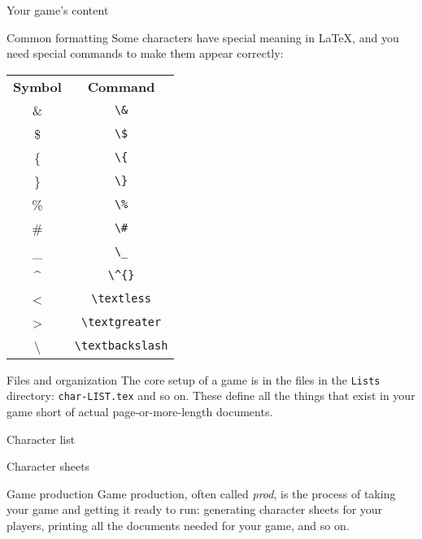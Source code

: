 \documentclass{article}
\begin{document}
\begin{section}{Your game's content}
\begin{subsection}{Common formatting}
Some characters have special meaning in \LaTeX{}, and you need special commands to make them appear correctly:

\begin{tabular}{c c}
 \textbf{Symbol} & \textbf{Command} \\
 \& & \lstinline|\&| \\
 \$ & \lstinline|\$| \\
 \{ & \lstinline|\{| \\
 \} & \lstinline|\}| \\
 \% & \lstinline|\%| \\
 \# & \lstinline|\#| \\
 \_ & \lstinline|\_| \\
 \^{} & \lstinline|\^{}| \\
 \textless & \lstinline|\textless| \\
 \textgreater & \lstinline|\textgreater| \\
 \textbackslash & \lstinline|\textbackslash|
\end{tabular}

\end{subsection}
\begin{subsection}{Files and organization}
The core setup of a game is in the files in the \lstinline{Lists} directory: \lstinline{char-LIST.tex} and so on.  These define all the things that exist in your game short of actual page-or-more-length documents.
\begin{subsubsection}{Character list}
\label{charlist}
\end{subsubsection}
\end{subsection}
\begin{subsection}{Character sheets}
\end{subsection}
\end{section}
\begin{section}{Game production}
Game production, often called \emph{prod}, is the process of taking your game and getting it ready to run: generating character sheets for your players, printing all the documents needed for your game, and so on.
\end{section}
\end{document}
